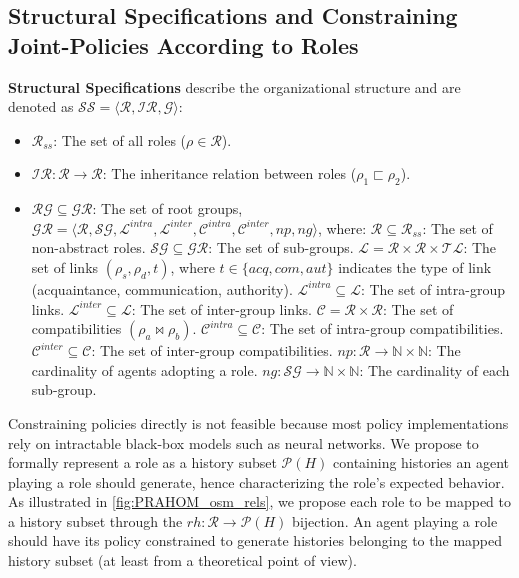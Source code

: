 \documentclass[sigconf,anonymous]{aamas}
\begin{document}
\subsection{Structural Specifications and Constraining Joint-Policies According to Roles}

\textbf{Structural Specifications} describe the organizational structure and are denoted as $\mathcal{SS} = \langle \mathcal{R}, \mathcal{IR}, \mathcal{G} \rangle$:

\begin{itemize}
  \item $\mathcal{R}_{ss}$: The set of all roles ($\rho \in \mathcal{R}$).
  \item $\mathcal{IR}: \mathcal{R} \rightarrow \mathcal{R}$: The inheritance relation between roles ($\rho_1 \sqsubset \rho_2$).
  \item $\mathcal{RG} \subseteq \mathcal{GR}$: The set of root groups, $\mathcal{GR} = \langle \mathcal{R}, \mathcal{SG}, \mathcal{L}^{intra}, \mathcal{L}^{inter}, \mathcal{C}^{intra}, \mathcal{C}^{inter}, \allowbreak np, ng \rangle$, where:
        $\mathcal{R} \subseteq \mathcal{R}_{ss}$: The set of non-abstract roles.
        $\mathcal{SG} \subseteq \mathcal{GR}$: The set of sub-groups.
        $\mathcal{L} = \mathcal{R} \times \mathcal{R} \times \mathcal{TL}$: The set of links $(\rho_s, \rho_d, t)$, where $t \in \{acq, com, aut\}$ indicates the type of link (acquaintance, communication, authority).
        $\mathcal{L}^{intra} \subseteq \mathcal{L}$: The set of intra-group links.
        $\mathcal{L}^{inter} \subseteq \mathcal{L}$: The set of inter-group links.
        $\mathcal{C} = \mathcal{R} \times \mathcal{R}$: The set of compatibilities $(\rho_a \bowtie \rho_b)$.
        $\mathcal{C}^{intra} \subseteq \mathcal{C}$: The set of intra-group compatibilities.
        $\mathcal{C}^{inter} \subseteq \mathcal{C}$: The set of inter-group compatibilities.
        $np: \mathcal{R} \rightarrow \mathbb{N} \times \mathbb{N}$: The cardinality of agents adopting a role.
        $ng: \mathcal{SG} \rightarrow \mathbb{N} \times \mathbb{N}$: The cardinality of each sub-group.
\end{itemize}

Constraining policies directly is not feasible because most policy implementations rely on intractable black-box models such as neural networks. We propose to formally represent a role as a history subset $\mathcal{P}(H)$ containing histories an agent playing a role should generate, hence characterizing the role's expected behavior. As illustrated in \autoref{fig:PRAHOM_osm_rels}, we propose each role to be mapped to a history subset through the $rh: \mathcal{R} \rightarrow \mathcal{P}(H)$ bijection. An agent playing a role should have its policy constrained to generate histories belonging to the mapped history subset (at least from a theoretical point of view).
\end{document}
